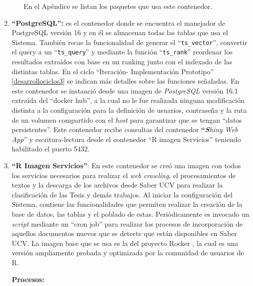 \documentclass[
  12pt,
  openany]{book}
\begin{document}
\begin{enumerate}
\begin{enumerate}
    En el Apéndice se listan los paquetes que usa este contenedor.
  \end{enumerate}
\item
  \textbf{``PostgreSQL'':} es el contenedor donde se encuentra el manejador de PostgreSQL versión 16 y en él se almacenan todas las tablas que usa el Sistema. También recae la funcionalidad de generar el ``\texttt{ts\_vector}'', convertir el query a un ``\texttt{ts\_query}'' y mediante la función ``\texttt{ts\_rank}'' reordenar los resultados extraídos con base en un ranking junto con el indexado de las distintas tablas. En el ciclo ``Iteración- Implementación Prototipo'' \ref{desarrollociclos3} se indican más detalles sobre las funciones señaladas. En este contenedor se instanció desde una imagen de \emph{PostgreSQL} versión 16.1 extraída del ``docker hub'', a la cual no le fue realizada ninguna modificación distinta a la configuración para la definición de usuarios, contraseña y la ruta de un volumen compartido con el \emph{host} para garantizar que se tengan ``datos persistentes''. Este contenedor recibe consultas del contenedor \textbf{``\emph{S}}\emph{hiny Web App}'' y escritura-lectura desde el contenedor ``R imagen Servicios'' teniendo habilitado el puerto 5432.
\item
  \textbf{``R Imagen Servicios''}: En este contenedor se creó una imagen con todos los servicios necesarios para realizar el \emph{web crawling}, el procesamientos de textos y la descarga de los archivos desde Saber UCV para realizar la clasificación de las Tesis y demás trabajos. Al iniciar la configuración del Sistema, contiene las funcionalidades que permiten realizar la creación de la base de datos, las tablas y el poblado de estas. Periódicamente es invocado un \emph{script} mediante un ``cron job'' para realizar los procesos de incorporación de aquellos documentos nuevos que se detecte que están disponibles en Saber UCV. La imagen base que se usa es la del proyecto Rocker \citep{RJ-2017-065:2017}, la cual es una versión ampliamente probada y optimizada por la comunidad de usuarios de R.

  \textbf{Procesos:}


\end{enumerate}
\end{document}
